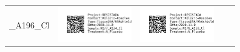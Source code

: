 \documentclass[10pt,notitlepage,letterpaper]{article}
\def\s{\phantom{xx}}
\def\w{1.27in}
\def\h{-0.030in}
\begin{document}
\begin{tabular}[t]{ c @{\s} c @{\s} c @{\s} c @{\s} c }
_A196_Cl} & \includegraphics[width=\w]{label_N177_A134_Cl} & \includegraphics[width=\w]{label_N178_A159_Cl} \\[\h]

\end{tabular}
\end{document}
